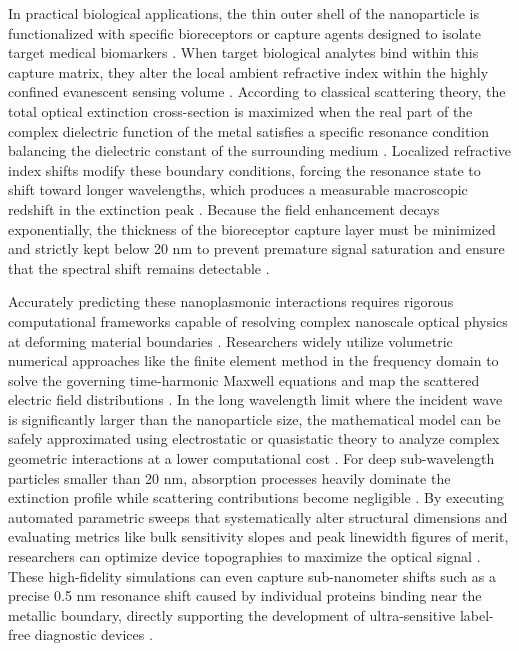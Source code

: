 \documentclass[class=report, crop=false]{standalone}
\begin{document}
\vspace{12pt}

In practical biological applications, the thin outer shell of the nanoparticle is functionalized with specific bioreceptors or capture agents designed to isolate target medical biomarkers \citep{Mayer2011}. When target biological analytes bind within this capture matrix, they alter the local ambient refractive index within the highly confined evanescent sensing volume \citep{Mayer2011, PhysRevE.100.063305}. According to classical scattering theory, the total optical extinction cross-section is maximized when the real part of the complex dielectric function of the metal satisfies a specific resonance condition balancing the dielectric constant of the surrounding medium \citep{Mayer2011, PhysRevE.100.063305}. Localized refractive index shifts modify these boundary conditions, forcing the resonance state to shift toward longer wavelengths, which produces a measurable macroscopic redshift in the extinction peak \citep{Mayer2011}. Because the field enhancement decays exponentially, the thickness of the bioreceptor capture layer must be minimized and strictly kept below 20 nm to prevent premature signal saturation and ensure that the spectral shift remains detectable \citep{Mayer2011}.

\vspace{12pt}

Accurately predicting these nanoplasmonic interactions requires rigorous computational frameworks capable of resolving complex nanoscale optical physics at deforming material boundaries \citep{SAINI2023383}. Researchers widely utilize volumetric numerical approaches like the finite element method in the frequency domain to solve the governing time-harmonic Maxwell equations and map the scattered electric field distributions \citep{SAINI2023383}. In the long wavelength limit where the incident wave is significantly larger than the nanoparticle size, the mathematical model can be safely approximated using electrostatic or quasistatic theory to analyze complex geometric interactions at a lower computational cost \citep{PhysRevE.100.063305}. For deep sub-wavelength particles smaller than 20 nm, absorption processes heavily dominate the extinction profile while scattering contributions become negligible \citep{PhysRevE.100.063305}. By executing automated parametric sweeps that systematically alter structural dimensions and evaluating metrics like bulk sensitivity slopes and peak linewidth figures of merit, researchers can optimize device topographies to maximize the optical signal \citep{Mayer2011, SAINI2023383}. These high-fidelity simulations can even capture sub-nanometer shifts such as a precise 0.5 nm resonance shift caused by individual proteins binding near the metallic boundary, directly supporting the development of ultra-sensitive label-free diagnostic devices \citep{PhysRevE.100.063305}.
\end{document}
